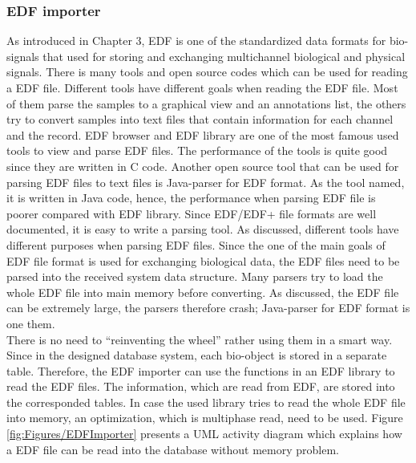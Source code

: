 \subsubsection{EDF importer}
As introduced in Chapter 3, EDF is one of the standardized data formats for bio-signals that used for storing and exchanging multichannel biological and physical signals. There is many tools and open source codes which can be used for reading a EDF file. Different tools have different goals when reading the EDF file. Most of them parse the samples to a graphical view and an annotations list, the others try to convert samples into text files that contain information for each channel and the record. EDF browser and EDF library\cite{EDFLIB} are one of the most famous used tools to view and parse EDF files. The performance of the tools is quite good since they are written in C code. Another open source tool that can be used for parsing EDF files to text files is Java-parser for EDF format\cite{EDF4J}. As the tool named, it is written in Java code, hence, the performance when parsing EDF file is poorer compared with EDF library. Since EDF/EDF+ file formats are well documented, it is easy to write a parsing tool. As discussed, different tools have different purposes when parsing EDF files. Since the one of the main goals of EDF file format is used for exchanging biological data, the EDF files need to be parsed into the received system data structure. Many parsers try to load the whole EDF file into main memory before converting. As discussed, the EDF file can be extremely large, the parsers therefore crash; Java-parser for EDF format is one them.\\
There is no need to “reinventing the wheel” rather using them in a smart way. Since in the designed database system, each bio-object is stored in a separate table. Therefore, the EDF importer can use the functions in an EDF library to read the EDF files. The information, which are read from EDF, are stored into the corresponded tables. In case the used library tries to read the whole EDF file into memory, an optimization, which is multiphase read, need to be used. Figure \ref{fig:Figures/EDFImporter} presents a UML activity diagram which explains how a EDF file can be read into the database without memory problem.
